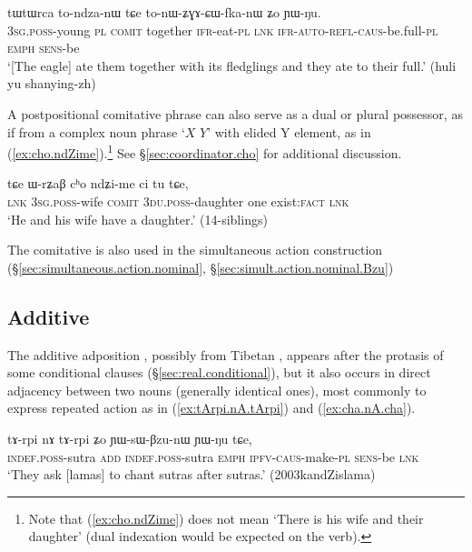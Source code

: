 \begin{exe}
\ex \label{ex:WpW.ra.cho}
\gll [ɯ-pɯ ra cʰo] tɯtɯrca to-ndza-nɯ tɕe to-nɯ-ʑɣɤ-ɕɯ-fka-nɯ ʑo ɲɯ-ŋu. \\
\textsc{3sg}.\textsc{poss}-young \textsc{pl} \textsc{comit} together \textsc{ifr}-eat-\textsc{pl} \textsc{lnk} \textsc{ifr}-\textsc{auto}-\textsc{refl}-\textsc{caus}-be.full-\textsc{pl} \textsc{emph} \textsc{sens}-be \\
\glt `[The eagle] ate them together with its fledglings and they ate to their full.' (huli yu shanying-zh)
\end{exe}

A postpositional comitative phrase can also serve as a dual or plural possessor, as if from a complex noun phrase `$X$  $Y$' with elided Y element, as in (\ref{ex:cho.ndZime}).\footnote{Note that (\ref{ex:cho.ndZime}) does not mean `There is his wife and their daughter' (dual indexation would be expected on the verb).} See §\ref{sec:coordinator.cho} for additional discussion.


\begin{exe}
\ex \label{ex:cho.ndZime}
\gll tɕe ɯ-rʑaβ cʰo ndʑi-me ci tu tɕe, \\
\textsc{lnk} \textsc{3sg}.\textsc{poss}-wife \textsc{comit} \textsc{3du}.\textsc{poss}-daughter one exist:\textsc{fact} \textsc{lnk} \\
\glt `He and his wife have a daughter.' (14-siblings)
\end{exe}
 
The comitative is also used in the simultaneous action construction (§\ref{sec:simultaneous.action.nominal}, §\ref{sec:simult.action.nominal.Bzu})
 
\subsection{Additive} \label{sec:additive.nA} 
The additive adposition , possibly from Tibetan , appears after the protasis of some conditional clauses (§\ref{sec:real.conditional}), but it also occurs in direct adjacency between two nouns (generally identical ones), most commonly to express  repeated action as in (\ref{ex:tArpi.nA.tArpi}) and (\ref{ex:cha.nA.cha}).
 
\begin{exe}
\ex  \label{ex:tArpi.nA.tArpi}
\gll tɤ-rpi nɤ tɤ-rpi ʑo ɲɯ-sɯ-βzu-nɯ ɲɯ-ŋu tɕe, \\
\textsc{indef}.\textsc{poss}-sutra \textsc{add} \textsc{indef}.\textsc{poss}-sutra \textsc{emph} \textsc{ipfv}-\textsc{caus}-make-\textsc{pl} \textsc{sens}-be \textsc{lnk} \\
\glt `They ask [lamas] to chant sutras after sutras.' (2003kandZislama)
\end{exe} 


